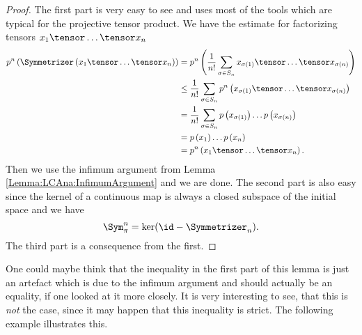 \begin{proof}
	The first part is very easy to see and uses most of the tools which are 
	typical for the projective tensor product. We have the estimate for 
	factorizing tensors $x_1 \tensor \ldots \tensor x_n$
	\begin{align*}
		p^n \left(
			\Symmetrizer \left(
				x_1 \tensor \ldots \tensor x_n
			\right)
		\right)
		& =
		p^n \left(
			\frac{1}{n!}
			\sum	\limits_{\sigma \in S_n}
			x_{\sigma(1)} 
			\tensor \ldots \tensor 
			x_{\sigma(n)}
		\right)
		\\
		& \leq
		\frac{1}{n!}
		\sum\limits_{\sigma \in S_n}
		p^n \left(
			x_{\sigma(1)} 
			\tensor \ldots \tensor 
			x_{\sigma(n)}
		\right)
		\\
		& =
		\frac{1}{n!}
		\sum\limits_{\sigma \in S_n}
		p \left( x_{\sigma(1)} \right)
		\ldots
		p \left( x_{\sigma(n)} \right)
		\\
		& =
		p \left( x_1 \right)
		\ldots
		p \left( x_n \right)
		\\
		& =
		p^n \left(
			x_1 \tensor \ldots \tensor x_n
		\right).
	\end{align*}
	Then we use the infimum argument from Lemma 
	\ref{Lemma:LCAna:InfimumArgument} and we are done.
	The second part is also easy since the kernel of a continuous map is
	always a closed subspace of the initial space and we have
	\begin{equation*}
		\Sym_{\pi}^n 
		= 
		\ker (\id - \Symmetrizer_n).
	\end{equation*}
	The third part is a consequence from the first.
\end{proof}
One could maybe think that the inequality in the first part of this lemma is 
just an artefact which is due to the infimum argument and should actually be 
an equality, if one looked at it more closely. It is very interesting to see, 
that this is \textit{not} the case, since it may happen that this 
inequality is strict. The following example illustrates this.
